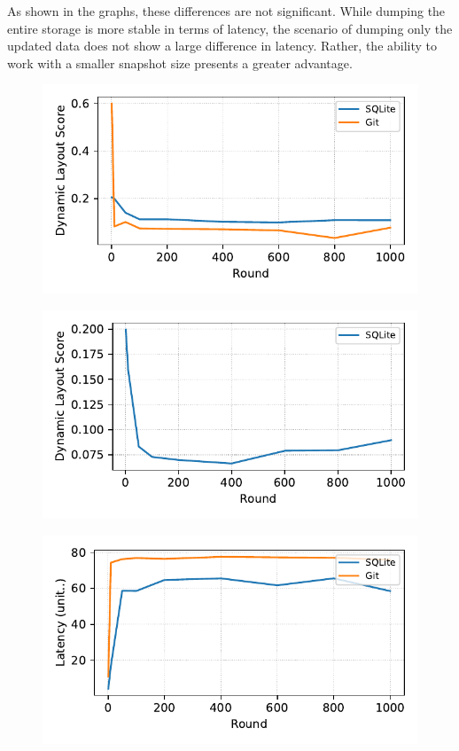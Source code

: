 As shown in the graphs, these differences are not significant.
While dumping the entire storage is more stable in terms of latency, the scenario of dumping only the updated data does not show a large difference in latency.
Rather, the ability to work with a smaller snapshot size presents a greater advantage.


\begin{figure}[t]
    \centering
    \includegraphics[width=0.95\columnwidth]{graphs/py_graph/dynamic}
    \caption{}
    \label{f:dynamic}
\end{figure}

\begin{figure}[t]
    \centering
    \includegraphics[width=0.95\columnwidth]{graphs/py_graph/dynamic-f2fs}
    \caption{}
    \label{f:f2fs_dynamic_score}
\end{figure}


\begin{figure}[t]
    \centering
    \includegraphics[width=0.95\columnwidth]{graphs/py_graph/latency}
    \caption{}
    \label{f:latency}
\end{figure}

